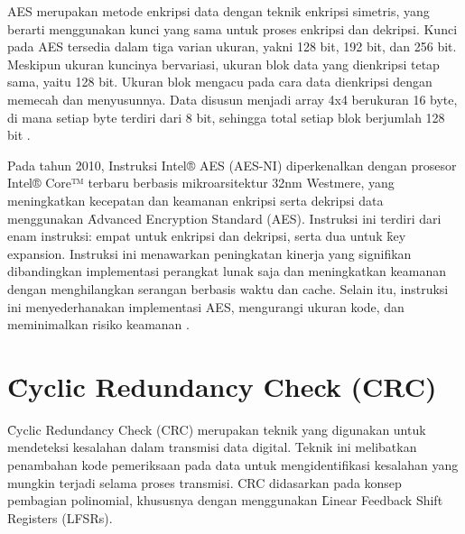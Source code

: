 AES merupakan metode enkripsi data dengan teknik enkripsi simetris, yang berarti menggunakan kunci yang sama untuk proses enkripsi dan dekripsi. Kunci pada AES tersedia dalam tiga varian ukuran, yakni 128 bit, 192 bit, dan 256 bit. Meskipun ukuran kuncinya bervariasi, ukuran blok data yang dienkripsi tetap sama, yaitu 128 bit. Ukuran blok mengacu pada cara data dienkripsi dengan memecah dan menyusunnya. Data disusun menjadi array 4x4 berukuran 16 byte, di mana setiap byte terdiri dari 8 bit, sehingga total setiap blok berjumlah 128 bit \cite{NistAes}.

Pada tahun 2010, Instruksi Intel® AES (AES-NI) diperkenalkan dengan prosesor Intel® Core™ terbaru berbasis mikroarsitektur 32nm Westmere, yang meningkatkan kecepatan dan keamanan enkripsi serta dekripsi data menggunakan \f{Advanced Encryption Standard} (AES). Instruksi ini terdiri dari enam instruksi: empat untuk enkripsi dan dekripsi, serta dua untuk \f{key expansion}. Instruksi ini menawarkan peningkatan kinerja yang signifikan dibandingkan implementasi perangkat lunak saja dan meningkatkan keamanan dengan menghilangkan serangan berbasis waktu dan cache. Selain itu, instruksi ini menyederhanakan implementasi AES, mengurangi ukuran kode, dan meminimalkan risiko keamanan \cite{aes-323641-001}.


\section{\f{Cyclic Redundancy Check} (CRC)}
\f{Cyclic Redundancy Check} (CRC) merupakan teknik yang digunakan untuk mendeteksi kesalahan dalam transmisi data digital. Teknik ini melibatkan penambahan kode pemeriksaan pada data untuk mengidentifikasi kesalahan yang mungkin terjadi selama proses transmisi. CRC didasarkan pada konsep pembagian polinomial, khususnya dengan menggunakan \f{Linear Feedback Shift Registers} (LFSRs).

